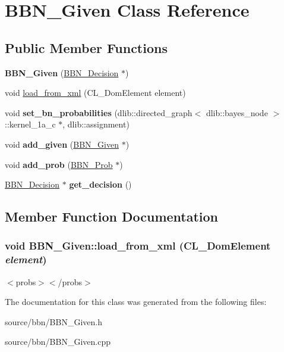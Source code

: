 \hypertarget{classBBN__Given}{
\section{BBN\_\-Given Class Reference}
\label{classBBN__Given}
}
\subsection*{Public Member Functions}
\begin{DoxyCompactItemize}
\item 
\hypertarget{classBBN__Given_a635f679fb9aeb8a2d3e392d662a3ab32}{
{\bfseries BBN\_\-Given} (\hyperlink{classBBN__Decision}{BBN\_\-Decision} $\ast$)}
\label{classBBN__Given_a635f679fb9aeb8a2d3e392d662a3ab32}

\item 
void \hyperlink{classBBN__Given_a4fa48a165c7a57b769e52a17eeb656da}{load\_\-from\_\-xml} (CL\_\-DomElement element)
\item 
\hypertarget{classBBN__Given_ab988a8ed1aec3081c0d2ad83c9f36b03}{
void {\bfseries set\_\-bn\_\-probabilities} (dlib::directed\_\-graph$<$ dlib::bayes\_\-node $>$::kernel\_\-1a\_\-c $\ast$, dlib::assignment)}
\label{classBBN__Given_ab988a8ed1aec3081c0d2ad83c9f36b03}

\item 
\hypertarget{classBBN__Given_a79f6fa09ba09189d57a70ecc2636b46d}{
void {\bfseries add\_\-given} (\hyperlink{classBBN__Given}{BBN\_\-Given} $\ast$)}
\label{classBBN__Given_a79f6fa09ba09189d57a70ecc2636b46d}

\item 
\hypertarget{classBBN__Given_a28380798d337d9429ac40d6ac753e8bc}{
void {\bfseries add\_\-prob} (\hyperlink{classBBN__Prob}{BBN\_\-Prob} $\ast$)}
\label{classBBN__Given_a28380798d337d9429ac40d6ac753e8bc}

\item 
\hypertarget{classBBN__Given_a64c2400d23211484048787a069f24c89}{
\hyperlink{classBBN__Decision}{BBN\_\-Decision} $\ast$ {\bfseries get\_\-decision} ()}
\label{classBBN__Given_a64c2400d23211484048787a069f24c89}

\end{DoxyCompactItemize}


\subsection{Member Function Documentation}
\hypertarget{classBBN__Given_a4fa48a165c7a57b769e52a17eeb656da}{
\subsubsection[{load\_\-from\_\-xml}]{\setlength{\rightskip}{0pt plus 5cm}void BBN\_\-Given::load\_\-from\_\-xml (CL\_\-DomElement {\em element})}}
\label{classBBN__Given_a4fa48a165c7a57b769e52a17eeb656da}


$<$probs$>$$<$/probs$>$



The documentation for this class was generated from the following files:\begin{DoxyCompactItemize}
\item 
source/bbn/BBN\_\-Given.h\item 
source/bbn/BBN\_\-Given.cpp\end{DoxyCompactItemize}
